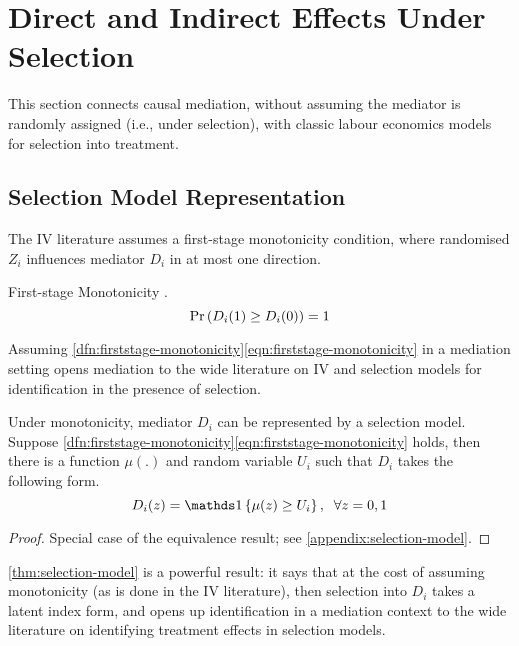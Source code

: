 \section{Direct and Indirect Effects Under Selection}
\label{sec:metrics}
This section connects causal mediation, without assuming the mediator is randomly assigned (i.e., under selection), with classic labour economics models for selection into treatment.

\subsection{Selection Model Representation}
\label{sec:selection-model}
The IV literature assumes a first-stage monotonicity condition, where randomised $Z_i$ influences mediator $D_i$ in at most one direction.
\begin{definition}
    \label{dfn:firststage-monotonicity}
    First-stage Monotonicity \citep{imbens1994identification}.
    \begin{equation}
        \label{eqn:firststage-monotonicity}
        \Pr\left(  D_i(1) \geq D_i(0) \right) = 1    
    \end{equation}
\end{definition}

Assuming \ref{dfn:firststage-monotonicity}\eqref{eqn:firststage-monotonicity}
in a mediation setting opens mediation to the wide literature on IV and selection models for identification in the presence of selection. 
\begin{theorem}
    \label{thm:selection-model}
    Under monotonicity, mediator $D_i$ can be represented by a selection model. \\
    Suppose \ref{dfn:firststage-monotonicity}\eqref{eqn:firststage-monotonicity} holds, then there is a function $\mu(.)$ and random variable $U_i$ such that $D_i$ takes the following form.
    \[ D_i(z) = \indicator{ \mu(z) \geq U_i}, \;\; \forall z = 0,1 \]
\end{theorem}
\begin{proof}
    Special case of the \cite{vytlacil2002independence} equivalence result; see \autoref{appendix:selection-model}.
\end{proof}

\autoref{thm:selection-model} is a powerful result: it says that at the cost of assuming monotonicity (as is done in the IV literature), then selection into $D_i$ takes a latent index form, and opens up identification in a mediation context to the wide literature on identifying treatment effects in selection models.

